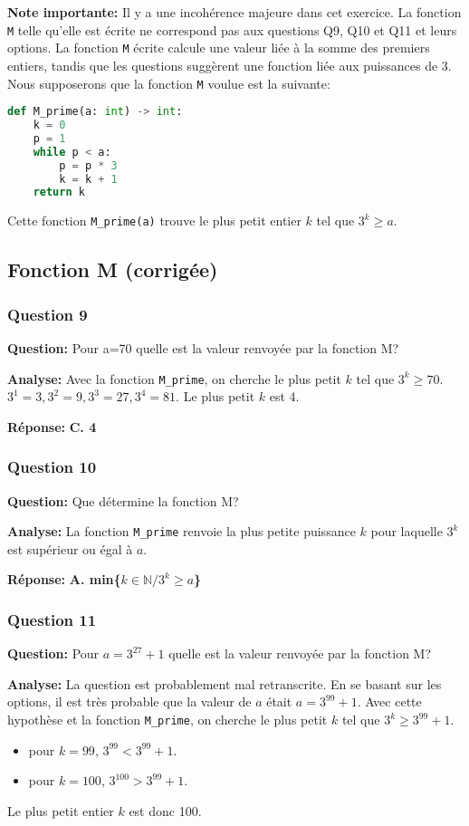 \documentclass[12pt,a4paper]{article}
\begin{document}
\textbf{Note importante:} Il y a une incohérence majeure dans cet exercice. La fonction \texttt{M} telle qu'elle est écrite ne correspond pas aux questions Q9, Q10 et Q11 et leurs options. La fonction \texttt{M} écrite calcule une valeur liée à la somme des premiers entiers, tandis que les questions suggèrent une fonction liée aux puissances de 3. Nous supposerons que la fonction \texttt{M} voulue est la suivante:
\begin{lstlisting}[language=python]
def M_prime(a: int) -> int:
    k = 0
    p = 1
    while p < a:
        p = p * 3
        k = k + 1
    return k
\end{lstlisting}
Cette fonction \texttt{M\_prime(a)} trouve le plus petit entier $k$ tel que $3^k \ge a$.

\subsection{Fonction M (corrigée)}
\subsubsection{Question 9}
\textbf{Question:} Pour a=70 quelle est la valeur renvoyée par la fonction M?

\textbf{Analyse:} Avec la fonction \texttt{M\_prime}, on cherche le plus petit $k$ tel que $3^k \ge 70$.
$3^1=3, 3^2=9, 3^3=27, 3^4=81$.
Le plus petit $k$ est 4.

\textbf{Réponse:} \textbf{C. 4}

\subsubsection{Question 10}
\textbf{Question:} Que détermine la fonction M?

\textbf{Analyse:} La fonction \texttt{M\_prime} renvoie la plus petite puissance $k$ pour laquelle $3^k$ est supérieur ou égal à $a$.

\textbf{Réponse:} \textbf{A. min\{$k \in \mathbb{N} / 3^k \ge a$\}}

\subsubsection{Question 11}
\textbf{Question:} Pour $a=3^{27}+1$ quelle est la valeur renvoyée par la fonction M?

\textbf{Analyse:} La question est probablement mal retranscrite. En se basant sur les options, il est très probable que la valeur de $a$ était $a=3^{99}+1$. Avec cette hypothèse et la fonction \texttt{M\_prime}, on cherche le plus petit $k$ tel que $3^k \ge 3^{99}+1$.
\begin{itemize}
    \item pour $k=99$, $3^{99} < 3^{99}+1$.
    \item pour $k=100$, $3^{100} > 3^{99}+1$.
\end{itemize}
Le plus petit entier $k$ est donc 100.
\end{document}
